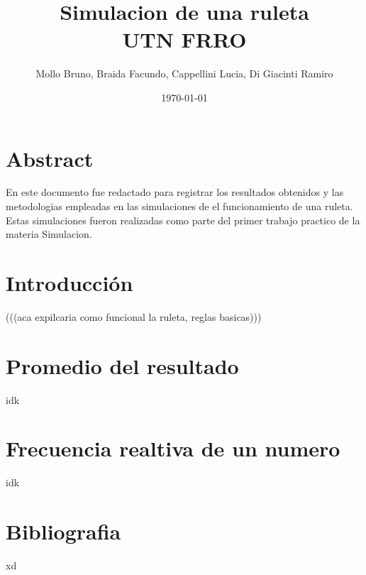 \documentclass{article}
\title{Simulacion de una ruleta \\
{\Large UTN FRRO}
}
\author{Mollo Bruno, Braida Facundo, Cappellini Lucia, Di Giacinti Ramiro}
\date{\today}
\begin{document}
\maketitle

\section*{Abstract}
En este documento fue redactado para registrar los
resultados obtenidos y las metodologias empleadas
en las simulaciones de el funcionamiento
de una ruleta. Estas simulaciones fueron realizadas como parte
del primer trabajo practico de la materia Simulacion.

\section{Introducción}
(((aca expilcaria como funcional la ruleta, reglas basicas)))

\section{Promedio del resultado}
idk


\section{Frecuencia realtiva de un numero}
idk

\section{Bibliografia}
xd
\end{document}
